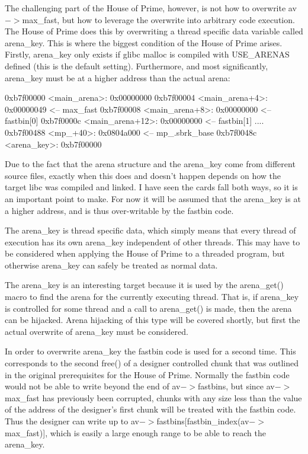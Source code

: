 \documentclass[12pt]{article}
\begin{document}
The challenging part of the House of Prime, however, is not how to
overwrite av$->$max\_fast, but how to leverage the overwrite into
arbitrary code execution. The House of Prime does this by
overwriting a thread specific data variable called arena\_key. This
is where the biggest condition of the House of Prime arises.
Firstly, arena\_key only exists if glibc malloc is compiled with
USE\_ARENAS defined (this is the default setting). Furthermore, and
most significantly, arena\_key must be at a higher address than the
actual arena:
\begin{verbnobox}[\small]
0xb7f00000 <main_arena>:        0x00000000
0xb7f00004 <main_arena+4>:      0x00000049      <-- max_fast
0xb7f00008 <main_arena+8>:      0x00000000      <-- fastbin[0]
0xb7f0000c <main_arena+12>:     0x00000000      <-- fastbin[1]
....
0xb7f00488 <mp_+40>:            0x0804a000      <-- mp_.sbrk_base
0xb7f0048c <arena_key>:         0xb7f00000
\end{verbnobox}

Due to the fact that the arena structure and the arena\_key come
from different source files, exactly when this does and doesn't
happen depends on how the target libc was compiled and linked. I
have seen the cards fall both ways, so it is an important point to
make. For now it will be assumed that the arena\_key is at a higher
address, and is thus over-writable by the fastbin code.
\newline


The arena\_key is thread specific data, which simply means that
every thread of execution has its own arena\_key independent of
other threads. This may have to be considered when applying the
House of Prime to a threaded program, but otherwise arena\_key can
safely be treated as normal data.
\newline


The arena\_key is an interesting target because it is used by the
arena\_get() macro to find the arena for the currently executing
thread. That is, if arena\_key is controlled for some thread and a
call to arena\_get() is made, then the arena can be hijacked. Arena
hijacking of this type will be covered shortly, but first the
actual overwrite of arena\_key must be considered.
\newline


In order to overwrite arena\_key the fastbin code is used for a
second time. This corresponds to the second free() of a designer
controlled chunk that was outlined in the original prerequisites
for the House of Prime. Normally the fastbin code would not be able
to write beyond the end of av$->$fastbins, but since av$->$max\_fast has
previously been corrupted, chunks with any size less than the value
of the address of the designer's first chunk will be treated with
the fastbin code. Thus the designer can write up to av$->$fastbins[fastbin\_index(av$->$max\_fast)], which is easily a large
enough range to be able to reach the arena\_key.
\newline
\end{document}

